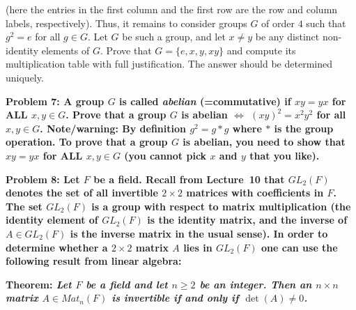 \documentclass[11pt]{amsart}
\begin{document}
(here the entries in the first column and the first row are the row and column labels, respectively).
\skv
Thus, it remains to consider groups $G$ of order $4$ such that $g^2=e$ for all $g\in G$. Let $G$ be such a group, and let
$x\neq y$ be any distinct non-identity elements of $G$. Prove that $G=\{e,x,y,xy\}$ and compute its multiplication table
with full justification. The answer should be determined uniquely.



\skv
\bf{Problem 7: }\rm A group $G$ is called {\it abelian} (=commutative)
if $xy=yx$ for ALL $x,y\in G$.
Prove that a group $G$ is abelian $\iff$ $(xy)^2=x^2 y^2$ for all $x,y\in G$.
\skv
{\bf Note/warning:} By definition $g^2=g*g$ where $*$ is the group operation.
To prove that a group $G$ is abelian, you need to 
show that $xy=yx$ for ALL $x,y\in G$ (you cannot pick $x$ and $y$ that you like).


\bf{Problem 8: }\rm Let $F$ be a field. Recall from Lecture~10 that $GL_2(F)$ denotes the set of all {\bf invertible } $2\times 2$ matrices with coefficients in $F$. The set $GL_2(F)$ is a group with respect to matrix multiplication
(the identity element of $GL_2(F)$ is the identity matrix, and the inverse of
$A\in GL_2(F)$ is the inverse matrix in the usual sense).
In order to determine whether a $2\times 2$ matrix $A$ lies in $GL_2(F)$
one can use the following result from linear algebra:

\skv
\bf{Theorem: }\it Let $F$ be a field and let $n\geq 2$ be an integer. Then an $n\times n$
matrix $A\in Mat_n(F)$ is invertible if and only if $\det(A)\neq 0$.\rm
\skv
\end{document}
